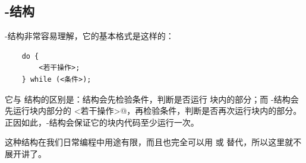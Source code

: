 \subsection*{\lstinline@do@-\lstinline@while@ 结构}
\lstinline@do@-\lstinline@while@ 结构非常容易理解，它的基本格式是这样的：
\begin{lstlisting}
    do {
        <若干操作>;
    } while (<条件>);
\end{lstlisting}
它与 \lstinline@while@ 结构的区别是：\lstinline@while@ 结构会先检验条件，判断是否运行 \lstinline@while@ 块内的部分；而 \lstinline@do@-\lstinline@while@ 结构会先运行块内部分的 \lstinline@<若干操作>@，再检验条件，判断是否再次运行块内的部分。正因如此，\lstinline@do@-\lstinline@while@ 结构会保证它的块内代码至少运行一次。\par
这种结构在我们日常编程中用途有限，而且也完全可以用 \lstinline@while@ 或 \lstinline@for@ 替代，所以这里就不展开讲了。\par
